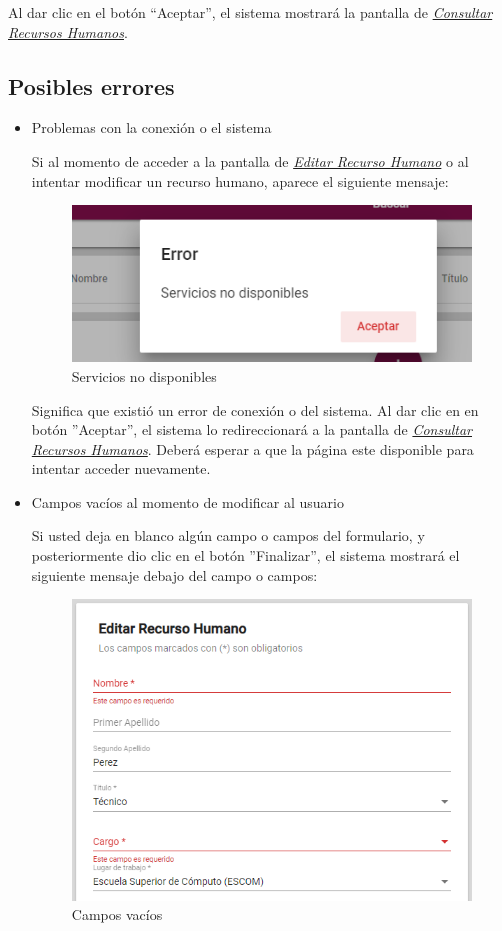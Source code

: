                 Al dar clic en el botón “Aceptar”, el sistema mostrará la pantalla de \hyperlink{consultarRH}{\textit{Consultar Recursos Humanos}}.
                
                \subsection{Posibles errores}
                    \begin{itemize}
                        \item Problemas con la conexión o el sistema
                    
                            Si al momento de acceder a la pantalla de \hyperlink{editarRH}{\textit{Editar Recurso Humano}} o al intentar modificar un recurso humano, aparece el siguiente mensaje:
                            \clearpage
                            \begin{figure}[!hbtp]
                                \centering
                                \includegraphics[width=0.4\linewidth]{images/SP1/MSGSN}
                                \caption{Servicios no disponibles}
                                
                            \end{figure}
                           
                        
                            Significa que existió un error de conexión o del sistema. Al dar clic en en botón ''Aceptar'', el sistema lo redireccionará  a la pantalla de \hyperlink{consultarRH}{\textit{Consultar Recursos Humanos}}. Deberá esperar a que la página este disponible para intentar acceder nuevamente.
                    
                        \item Campos vacíos al momento de modificar al usuario
                    
                            Si usted deja en blanco algún campo o campos del formulario, y posteriormente dio clic en el botón ''Finalizar'', el sistema mostrará el siguiente mensaje debajo del campo o campos:
                           
                          \begin{figure}[!hbtp]
                            \centering
                            \includegraphics[width=0.4\linewidth]{images/SP1/MSG44-1}
                            \caption{Campos vacíos}
                            \label{mensaje44}
                         

\end{figure}
\end{itemize}
